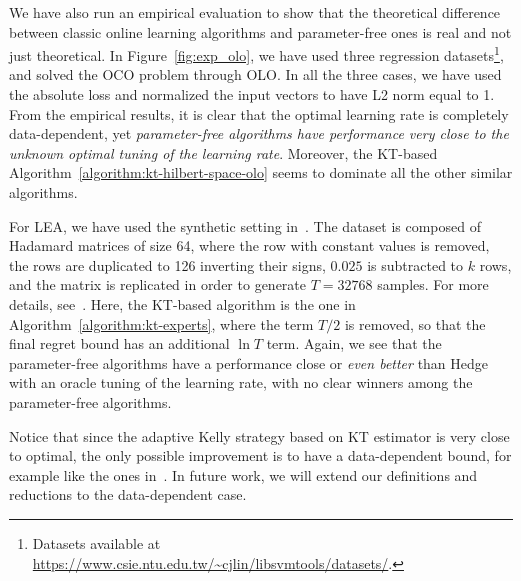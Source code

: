 We have also run an empirical evaluation to show that the theoretical
difference between classic online learning algorithms and parameter-free ones
is real and not just theoretical. In Figure~\ref{fig:exp_olo}, we have used
three regression datasets\footnote{Datasets available at
\url{https://www.csie.ntu.edu.tw/~cjlin/libsvmtools/datasets/}.}, and solved
the \ac{OCO} problem through \ac{OLO}. In all the three cases, we have used the
absolute loss and normalized the input vectors to have L2 norm equal to 1. From
the empirical results, it is clear that the optimal learning rate is completely
data-dependent, yet \emph{parameter-free algorithms have performance very close
to the unknown optimal tuning of the learning rate}. Moreover, the KT-based
Algorithm~\ref{algorithm:kt-hilbert-space-olo} seems to dominate all the other
similar algorithms.

For \ac{LEA}, we have used the synthetic setting
in~\cite{Chaudhuri-Freund-Hsu-2009}. The dataset is composed of Hadamard
matrices of size 64, where the row with constant values is removed, the rows
are duplicated to 126 inverting their signs, $0.025$ is subtracted to $k$ rows,
and the matrix is replicated in order to generate $T=32768$ samples. For more
details, see~\cite{Chaudhuri-Freund-Hsu-2009}. Here, the KT-based algorithm is
the one in Algorithm~\ref{algorithm:kt-experts}, where the term $T/2$ is
removed, so that the final regret bound has an additional $\ln T$ term.  Again,
we see that the parameter-free algorithms have a performance close or
\emph{even better} than Hedge with an oracle tuning of the learning rate, with
no clear winners among the parameter-free algorithms.

Notice that since the adaptive Kelly strategy based on KT estimator is very
close to optimal, the only possible improvement is to have a data-dependent
bound, for example like the ones in~\cite{Orabona-2014, Koolen-van-Erven-2015,
Luo-Schapire-2015}.  In future work, we will extend our definitions and
reductions to the data-dependent case.

